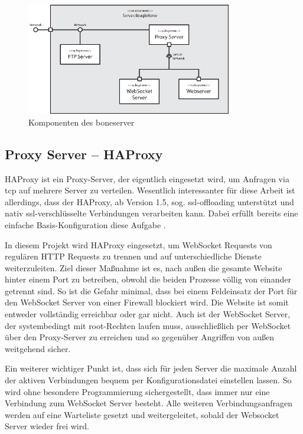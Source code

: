 \begin{figure}[ht]
\centering
\includegraphics[width = 0.8\textwidth]{documentation/images/componentsServer.eps}
\caption{Komponenten des boneserver}
\label{fig:componentsServer}
\end{figure}


\subsection{Proxy Server -- HAProxy}
\label{subsec:HAProxy}
HAProxy ist ein Proxy-Server, der eigentlich eingesetzt wird, um Anfragen via \gls{tcp} auf mehrere Server zu verteilen. Wesentlich interessanter für diese Arbeit ist allerdings, dass der HAProxy, ab Version 1.5, sog. \gls{ssl-offloading} unterstützt und nativ \gls{ssl}-verschlüsselte Verbindungen verarbeiten kann. Dabei erfüllt bereits eine einfache Basis-Konfiguration diese Aufgabe \cite{kuehnast2014}.

In diesem Projekt wird HAProxy eingesetzt, um WebSocket Requests von regulären HTTP Requests zu trennen und auf unterschiedliche Dienste weiterzuleiten. Ziel dieser Maßnahme ist es, nach außen die gesamte Website hinter einem Port zu betreiben, obwohl die beiden Prozesse völlig von einander getrennt sind. So ist die Gefahr minimal, dass bei einem Feldeinsatz der Port für den WebSocket Server von einer Firewall blockiert wird. Die Website ist somit entweder vollständig erreichbar oder gar nicht. Auch ist der WebSocket Server, der systembedingt mit root-Rechten laufen muss, ausschließlich per WebSocket über den Proxy-Server zu erreichen und so gegenüber Angriffen von außen weitgehend sicher.

Ein weiterer wichtiger Punkt ist, dass sich für jeden Server die maximale Anzahl der aktiven Verbindungen bequem per Konfigurationsdatei einstellen lassen. So wird ohne besondere Programmierung sichergestellt, dass immer nur eine Verbindung zum WebSocket Server besteht. Alle weiteren Verbindungsanfragen werden auf eine Warteliste gesetzt und weitergeleitet, sobald der Websocket Server wieder frei wird.\\

